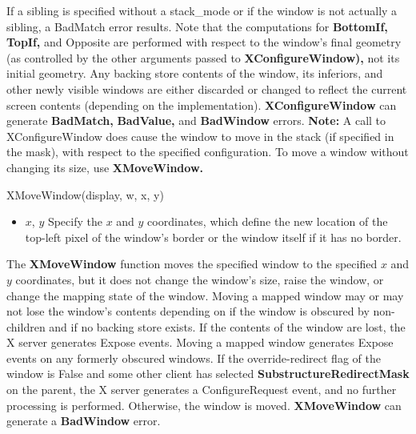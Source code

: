 \documentclass{report}
\begin{document}
\begin{itemize}
            \bigbreak \noindent 
            If a sibling is specified without a stack\_mode or if the window is not actually a sibling, a BadMatch error results. Note that the computations for \textbf{BottomIf,} \textbf{TopIf,} and Opposite are performed with respect to the window’s final geometry (as controlled by the other arguments passed to \textbf{XConfigureWindow),} not its initial geometry. Any backing store contents of the window, its inferiors, and other newly visible windows are either discarded or changed to reflect the current screen contents (depending on the implementation).
            \bigbreak \noindent 
            \textbf{XConfigureWindow} can generate \textbf{BadMatch,} \textbf{BadValue,} and \textbf{BadWindow} errors.
            \bigbreak \noindent 
            \textbf{Note:} A call to XConfigureWindow does cause the window to move in the stack (if specified in the mask), with respect to the specified configuration.
            \bigbreak \noindent 
            To move a window without changing its size, use \textbf{XMoveWindow.}
            \bigbreak \noindent 
            \begin{cppcode}
                XMoveWindow(display, w, x, y)
            \end{cppcode}
            \bigbreak \noindent
            \begin{itemize}
                \item $x$, $y$ Specify the $x$ and $y$ coordinates, which define the new location of the top-left pixel of the window’s border or the window itself if it has no border.
            \end{itemize}
            The \textbf{XMoveWindow} function moves the specified window to the specified $x$ and $y$ coordinates, but it does not change the window’s size, raise the window, or change the mapping state of the window. Moving a mapped window may or may not lose the window’s contents depending on if the window is obscured by non-children and if no backing store exists. If the contents of the window are lost, the X server generates Expose events. Moving a mapped window generates Expose events on any formerly obscured windows.
            \bigbreak \noindent 
            If the override-redirect flag of the window is False and some other client has selected \textbf{SubstructureRedirectMask} on the parent, the X server generates a ConfigureRequest event, and no further processing is performed. Otherwise, the window is moved.
            \bigbreak \noindent 
            \textbf{XMoveWindow} can generate a \textbf{BadWindow} error.

\end{itemize}
\end{document}
